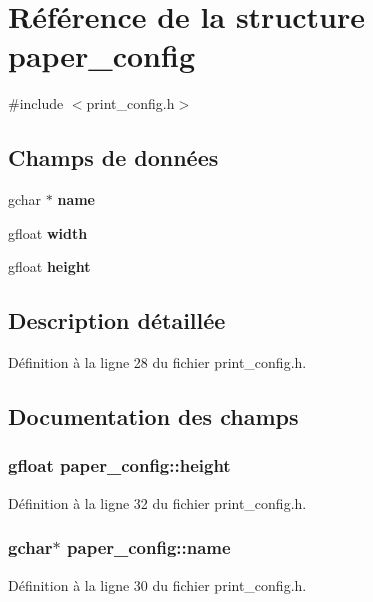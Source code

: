 \section{Référence de la structure paper\_\-config}
\label{structpaper__config}


{\ttfamily \#include $<$print\_\-config.h$>$}

\subsection*{Champs de données}
\begin{DoxyCompactItemize}
\item 
gchar $\ast$ {\bf name}
\item 
gfloat {\bf width}
\item 
gfloat {\bf height}
\end{DoxyCompactItemize}


\subsection{Description détaillée}


Définition à la ligne 28 du fichier print\_\-config.h.



\subsection{Documentation des champs}
\subsubsection[{height}]{\setlength{\rightskip}{0pt plus 5cm}gfloat {\bf paper\_\-config::height}}\label{structpaper__config_ac0f577e33e0fd6f17a517d608df7d1e4}


Définition à la ligne 32 du fichier print\_\-config.h.

\subsubsection[{name}]{\setlength{\rightskip}{0pt plus 5cm}gchar$\ast$ {\bf paper\_\-config::name}}\label{structpaper__config_a2832e101e6347b1740bca5b49e60259f}


Définition à la ligne 30 du fichier print\_\-config.h.

